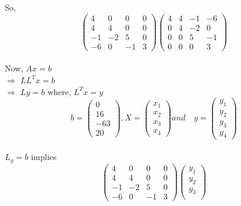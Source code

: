 \documentclass[a4paper, 12pt]{report}
\begin{document}
{    So,
    \begin{equation*}
    \begin{pmatrix}
    4 & 0 & 0 & 0\\
    4 & 4 & 0 & 0\\
    -1 & -2 & 5 & 0\\
    -6 & 0 & -1 & 3
    \end{pmatrix}
    \begin{pmatrix}
    4 & 4 & -1 & -6\\
    0 & 4 & -2 & 0\\
    0 & 0 & 5 & -1\\
    0 & 0 & 0 & 3
    \end{pmatrix}
    \end{equation*}\\
    Now, $Ax = b$\\
    $\Rightarrow$ $LL^Tx = b$\\
    $\Rightarrow$ $Ly = b$ \quad where, \quad $L^T x = y$
    \begin{equation*} b =
    \begin{pmatrix}
    0\\
    16\\
    -63\\
    20
    \end{pmatrix}
    ,X=
    \begin{pmatrix}
    x_1\\
    x_2\\
    x_3\\
    x_4
    \end{pmatrix}
    and \quad y=
    \begin{pmatrix}
    y_1\\
    y_2\\
    y_3\\
    y_4
    \end{pmatrix}
\end{equation*}\\
$L_y = b$ implies\\
\begin{equation*}
\begin{pmatrix}
4 & 0 & 0 & 0\\
4 & 4 & 0 & 0\\
-1 & -2 & 5 & 0\\
-6 & 0 & -1 & 3
\end{pmatrix}
\begin{pmatrix}
	y_1\\
	y_2\\
	y_3\\

\end{pmatrix}
\end{equation*}}
\end{document}
